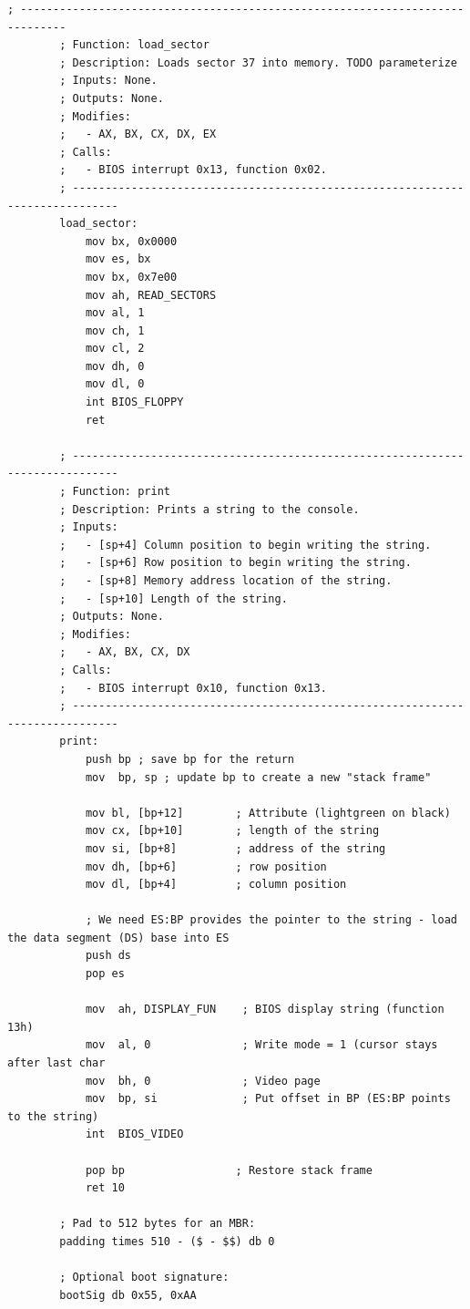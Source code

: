 \documentclass{article}
\begin{document}
\begin{lstlisting}[caption={os623V02.asm listing}, captionpos=t]
        ; -----------------------------------------------------------------------------
        ; Function: load_sector
        ; Description: Loads sector 37 into memory. TODO parameterize
        ; Inputs: None.
        ; Outputs: None.
        ; Modifies:
        ;   - AX, BX, CX, DX, EX
        ; Calls:
        ;   - BIOS interrupt 0x13, function 0x02.
        ; -----------------------------------------------------------------------------
        load_sector:
            mov bx, 0x0000
            mov es, bx
            mov bx, 0x7e00
            mov ah, READ_SECTORS
            mov al, 1
            mov ch, 1
            mov cl, 2
            mov dh, 0
            mov dl, 0
            int BIOS_FLOPPY
            ret

        ; -----------------------------------------------------------------------------
        ; Function: print
        ; Description: Prints a string to the console.
        ; Inputs:
        ;   - [sp+4] Column position to begin writing the string.
        ;   - [sp+6] Row position to begin writing the string.
        ;   - [sp+8] Memory address location of the string.
        ;   - [sp+10] Length of the string.
        ; Outputs: None.
        ; Modifies:
        ;   - AX, BX, CX, DX
        ; Calls:
        ;   - BIOS interrupt 0x10, function 0x13.
        ; -----------------------------------------------------------------------------
        print:
            push bp ; save bp for the return
            mov  bp, sp ; update bp to create a new "stack frame"

            mov bl, [bp+12]        ; Attribute (lightgreen on black)
            mov cx, [bp+10]        ; length of the string
            mov si, [bp+8]         ; address of the string
            mov dh, [bp+6]         ; row position
            mov dl, [bp+4]         ; column position

            ; We need ES:BP provides the pointer to the string - load the data segment (DS) base into ES
            push ds
            pop es

            mov  ah, DISPLAY_FUN    ; BIOS display string (function 13h)
            mov  al, 0              ; Write mode = 1 (cursor stays after last char
            mov  bh, 0              ; Video page
            mov  bp, si             ; Put offset in BP (ES:BP points to the string)
            int  BIOS_VIDEO

            pop bp                 ; Restore stack frame
            ret 10

        ; Pad to 512 bytes for an MBR:
        padding times 510 - ($ - $$) db 0

        ; Optional boot signature:
        bootSig db 0x55, 0xAA

    \end{lstlisting}
\end{document}
